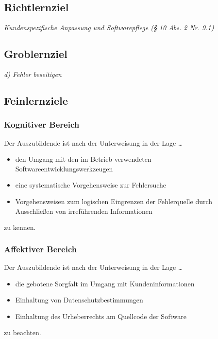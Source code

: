 \documentclass[11pt,a4paper,notitlepage,ngerman]{article}
\begin{document}
\subsection{Richtlernziel}

\emph{Kundenspezifische Anpassung und Softwarepflege (§ 10 Abs. 2 Nr. 9.1)}

\subsection{Groblernziel}

\emph{d) Fehler beseitigen}

\subsection{Feinlernziele}

\subsubsection{Kognitiver Bereich}

Der Auszubildende ist nach der Unterweisung in der Lage \ldots

\begin{itemize}
  \item{den Umgang mit den im Betrieb verwendeten Softwareentwicklungswerkzeugen}
  \item{eine systematische Vorgehensweise zur Fehlersuche}
  \item{Vorgehensweisen zum logischen Eingrenzen der Fehlerquelle durch Ausschließen von irreführenden Informationen}
\end{itemize}

zu kennen.

\subsubsection{Affektiver Bereich}

Der Auszubildende ist nach der Unterweisung in der Lage \ldots

\begin{itemize}
  \item{die gebotene Sorgfalt im Umgang mit Kundeninformationen}
  \item{Einhaltung von Datenschutzbestimmungen}
  \item{Einhaltung des Urheberrechts am Quellcode der Software}
\end{itemize}

zu beachten.
\end{document}
